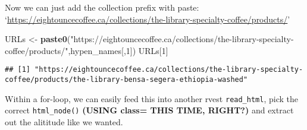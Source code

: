 \documentclass[]{article}
\newenvironment{Shaded}{\begin{snugshade}}{\end{snugshade}}
\newcommand{\DecValTok}[1]{\textcolor[rgb]{0.00,0.00,0.81}{#1}}
\newcommand{\KeywordTok}[1]{\textcolor[rgb]{0.13,0.29,0.53}{\textbf{#1}}}
\newcommand{\NormalTok}[1]{#1}
\newcommand{\StringTok}[1]{\textcolor[rgb]{0.31,0.60,0.02}{#1}}
\begin{document}
Now we can just add the collection prefix with paste:
`\url{https://eightouncecoffee.ca/collections/the-library-specialty-coffee/products/}'

\begin{Shaded}
\begin{Highlighting}[]
\NormalTok{URLs <-}\StringTok{ }\KeywordTok{paste0}\NormalTok{(}\StringTok{"https://eightouncecoffee.ca/collections/the-library-specialty-coffee/products/"}\NormalTok{,hypen_names[,}\DecValTok{1}\NormalTok{])}
\NormalTok{URLs[}\DecValTok{1}\NormalTok{]}
\end{Highlighting}
\end{Shaded}

\begin{verbatim}
## [1] "https://eightouncecoffee.ca/collections/the-library-specialty-coffee/products/the-library-bensa-segera-ethiopia-washed"
\end{verbatim}

Within a for-loop, we can easily feed this into another rvest
\texttt{read\_html}, pick the correct \texttt{html\_node()}
\textbf{(USING class= THIS TIME, RIGHT?)} and extract out the alititude
like we wanted.
\end{document}

